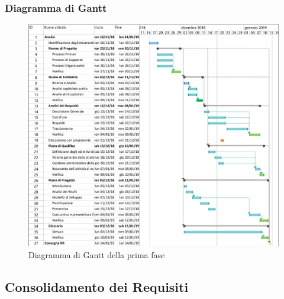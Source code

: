 \subsubsection{Diagramma di Gantt}
\begin{figure}[H]
	\includegraphics[scale=0.8]{res/images/gantt_analisi.jpg}
	\caption{Diagramma di Gantt della prima fase}
\end{figure}
\subsection{Consolidamento dei Requisiti}